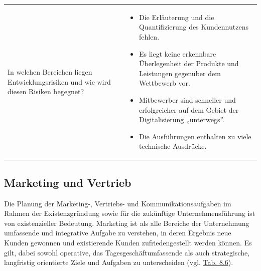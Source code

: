 \documentclass[
  letterpaper,
]{book}
\begin{document}
\begin{longtable}[]{@{}
  >{\raggedright\arraybackslash}p{}
  >{\raggedright\arraybackslash}p{}@{}}
\begin{minipage}[t]{\linewidth}
\begin{itemize}
  In welchen Bereichen liegen Entwicklungsrisiken und wie wird diesen
  Risiken begegnet?
\end{itemize}
\end{minipage} & \begin{minipage}[t]{\linewidth}\raggedright
\begin{itemize}
\item
  Die Erläuterung und die Quantifizierung des Kundennutzens fehlen.
\item
  Es liegt keine erkennbare Überlegenheit der Produkte und Leistungen
  gegenüber dem Wettbewerb vor.
\item
  Mitbewerber sind schneller und erfolgreicher auf dem Gebiet der
  Digitalisierung „unterwegs''.
\item
  Die Ausführungen enthalten zu viele technische Ausdrücke.
\end{itemize}
\end{minipage} \\
\end{longtable}

\subsection{Marketing und Vertrieb}\label{marketing-und-vertrieb}

Die Planung der Marketing-, Vertriebs- und Kommunikationsaufgaben im
Rahmen der Existenzgründung sowie für die zukünftige Unternehmensführung
ist von existenzieller Bedeutung. Marketing ist als alle Bereiche der
Unternehmung umfassende und integrative Aufgabe zu verstehen, in deren
Ergebnis neue Kunden gewonnen und existierende Kunden zufriedengestellt
werden können. Es gilt, dabei sowohl operative, das
Tagesgeschäftumfassende als auch strategische, langfristig orientierte
Ziele und Aufgaben zu unterscheiden (vgl. \hyperref[table86]{Tab. 8.6}).
\end{document}
